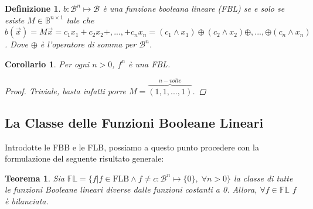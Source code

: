 \documentclass[12pt,a4paper,openright]{report}
\newcommand*\xor{\mathbin{\oplus}}
\newtheorem{mydef}{Definizione}[chapter]
\newtheorem*{mycor}{Corollario}
\newtheorem{mythm}{Teorema}
\begin{document}
\begin{mydef}
$b:\mathcal{B}^n \mapsto \mathcal{B}$ è una funzione booleana lineare (FBL) se e solo se esiste $M \in \mathbb{B}^{n \times 1}$ tale che $b(\vec{x})=M\vec{x}=c_1x_1+c_2x_2+,...,+c_nx_n=(c_1\land{x_1})\xor(c_2\land{x_2})\xor,...,\xor(c_n\land{x_n})$. Dove $\xor$
è l'operatore di somma per $\mathcal{B}^n$. 
\end{mydef}
\begin{mycor}
    Per ogni $n>0$, $f^n$ è una FBL.
    \begin{proof}
        Triviale, basta infatti porre $M=\overbrace{(1,1,...,1)}^{n-volte}$.
    \end{proof}
\end{mycor}

\subsection{La Classe delle Funzioni Booleane Lineari}
Introdotte le FBB e le FLB, possiamo a questo punto procedere con la formulazione del seguente risultato generale:
\begin{mythm}
    Sia $\mathbb{FL}=\{f|f\in\text{FLB} \land f \neq c:\mathcal{B}^n\mapsto\{0\},\;\forall n > 0\}$ la classe di tutte le funzioni Booleane lineari
    diverse dalle funzioni costanti a 0. Allora, $\forall f\in \mathbb{FL}$ $f$ è bilanciata.
\end{mythm}
\end{document}
